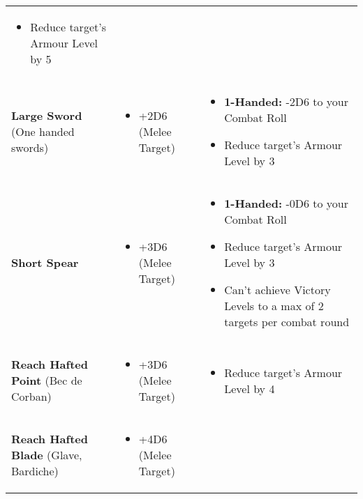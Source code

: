 \begin{center}
\begin{xltabular}{\textwidth}{|p{.25\textwidth} p{.3\textwidth} p{.35\textwidth}|}
\begin{itemize}
                    \item Reduce target’s Armour Level by 5
                \end{itemize} \\
        \raggedright\textbf{Large Sword} (One handed swords) &
            \begin{itemize}
                \item +2D6 (Melee Target)
            \end{itemize} &
                \begin{itemize}
                    \item \textbf{1-Handed:} -2D6 to your Combat Roll
                    \item Reduce target’s Armour Level by 3
                \end{itemize} \\
        \raggedright\textbf{Short Spear} &
            \begin{itemize}
                \item +3D6 (Melee Target)
            \end{itemize} &
                \begin{itemize}
                    \item \textbf{1-Handed:} -0D6 to your Combat Roll
                    \item Reduce target’s Armour Level by 3
                    \item Can’t achieve Victory Levels to a max of 2 targets per combat round
                \end{itemize} \\
        \raggedright\textbf{Reach Hafted Point} (Bec de Corban) &
            \begin{itemize}
                \item +3D6 (Melee Target)
            \end{itemize} &
                \begin{itemize}
                    \item Reduce target’s Armour Level by 4
                \end{itemize} \\
        \raggedright\textbf{Reach Hafted Blade} (Glave, Bardiche) &
            \begin{itemize}
                \item +4D6 (Melee Target)
            \end{itemize} &
                \begin{itemize}

\end{itemize}
\end{xltabular}
\end{center}
